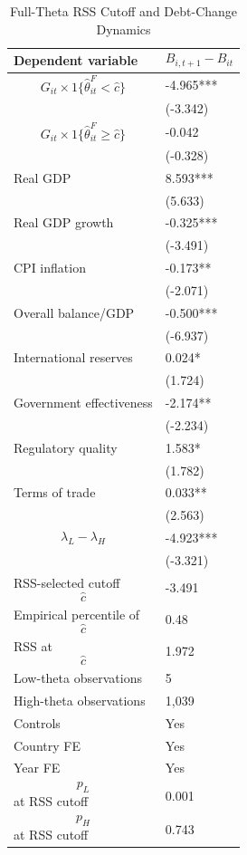\begin{table}[H]\centering
\begin{threeparttable}
\caption{Full-Theta RSS Cutoff and Debt-Change Dynamics}
\label{tab:deltaB_rss_cutoff_fulltheta}
\scriptsize
\begin{tabularx}{\textwidth}{lY}
\toprule
Dependent variable & $$B_{i,t+1}-B_{it}$$ \\
\midrule
$$G_{it}\times 1\{\widehat{\theta}^{F}_{it}<\widehat{c}\}$$ & -4.965*** \\
 & (-3.342) \\
$$G_{it}\times 1\{\widehat{\theta}^{F}_{it}\geq\widehat{c}\}$$ & -0.042 \\
 & (-0.328) \\
Real GDP & 8.593*** \\
 & (5.633) \\
Real GDP growth & -0.325*** \\
 & (-3.491) \\
CPI inflation & -0.173** \\
 & (-2.071) \\
Overall balance/GDP & -0.500*** \\
 & (-6.937) \\
International reserves & 0.024* \\
 & (1.724) \\
Government effectiveness & -2.174** \\
 & (-2.234) \\
Regulatory quality & 1.583* \\
 & (1.782) \\
Terms of trade & 0.033** \\
 & (2.563) \\
$$\lambda_L-\lambda_H$$ & -4.923*** \\
 & (-3.321) \\
\midrule
RSS-selected cutoff $$\widehat{c}$$ & -3.491 \\
Empirical percentile of $$\widehat{c}$$ & 0.48 \\
RSS at $$\widehat{c}$$ & 1.972 \\
Low-theta observations & 5 \\
High-theta observations & 1,039 \\
Controls & Yes \\
Country FE & Yes \\
Year FE & Yes \\
$$p_L$$ at RSS cutoff & 0.001 \\
$$p_H$$ at RSS cutoff & 0.743 \\

\end{tabularx}
\end{threeparttable}
\end{table}
